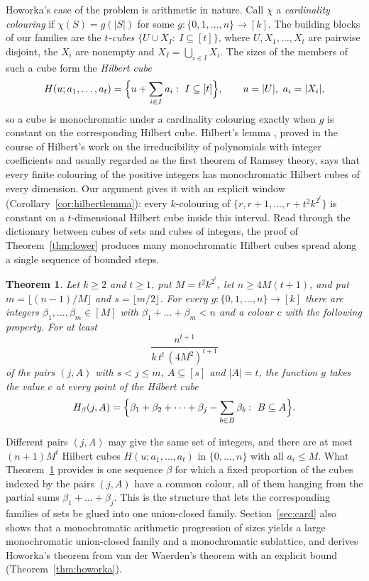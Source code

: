 \documentclass[11pt,reqno]{amsart}
\numberwithin{equation}{section}
\theoremstyle{plain}
\newtheorem{theorem}{Theorem}[section]
\theoremstyle{definition}
\theoremstyle{remark}
\begin{document}
Howorka's case of the problem is arithmetic in nature. Call $\chi$ a
\emph{cardinality colouring} if $\chi(S)=g(|S|)$ for some
$g:\{0,1,\dots,n\}\to[k]$. The building blocks of our families are the
\emph{$t$-cubes} $\{U\cup X_I:\ I\subseteq[t]\}$, where $U,X_1,\dots,X_t$
are pairwise disjoint, the $X_i$ are nonempty and
$X_I=\bigcup_{i\in I}X_i$. The sizes of the members of such a cube form
the \emph{Hilbert cube}
\[
H(u;a_1,\dots,a_t)=\Bigl\{u+\sum_{i\in I}a_i:\ I\subseteq[t]\Bigr\},
\qquad u=|U|,\ a_i=|X_i|,
\]
so a cube is monochromatic under a cardinality colouring exactly when $g$
is constant on the corresponding Hilbert cube. Hilbert's lemma
\cite{Hi1892}, proved in the course of Hilbert's work on the
irreducibility of polynomials with integer coefficients and usually
regarded as the first theorem of Ramsey theory, says that every finite
colouring of the positive integers has monochromatic Hilbert cubes of
every dimension. Our argument gives it with an explicit window
(Corollary~\ref{cor:hilbertlemma}): every $k$-colouring of
$\{r,r+1,\dots,r+t^{2}k^{2^{t}}\}$ is constant on a $t$-dimensional
Hilbert cube inside this interval. Read through the dictionary between
cubes of sets and cubes of integers, the proof of Theorem~\ref{thm:lower}
produces many monochromatic Hilbert cubes spread along a single sequence
of bounded steps.

\begin{theorem}
\label{thm:hilbert}
Let $k\ge2$ and $t\ge1$, put $M=t^{2}k^{2^{t}}$, let $n\ge4M(t+1)$, and
put $m=\lfloor(n-1)/M\rfloor$ and $s=\lfloor m/2\rfloor$. For every
$g:\{0,1,\dots,n\}\to[k]$ there are integers
$\beta_1,\dots,\beta_m\in[M]$ with $\beta_1+\dots+\beta_m<n$ and a colour
$c$ with the following property. For at least
\[
\frac{n^{t+1}}{k\,t^{t}\,(4M^{2})^{t+1}}
\]
of the pairs $(j,A)$ with $s<j\le m$, $A\subseteq[s]$ and $|A|=t$, the
function $g$ takes the value $c$ at every point of the Hilbert cube
\[
H_\beta(j,A)=\Bigl\{\beta_1+\beta_2+\dots+\beta_j-\sum_{b\in B}\beta_b:\
B\subseteq A\Bigr\}.
\]
\end{theorem}

Different pairs $(j,A)$ may give the same set of integers, and there are
at most $(n+1)M^{t}$ Hilbert cubes $H(u;a_1,\dots,a_t)$ in
$\{0,\dots,n\}$ with all $a_i\le M$. What Theorem~\ref{thm:hilbert}
provides is one sequence $\beta$ for which a fixed proportion of the cubes
indexed by the pairs $(j,A)$ have a common colour, all of them hanging
from the partial sums $\beta_1+\dots+\beta_j$. This is the structure that
lets the corresponding families of sets be glued into one union-closed
family. Section~\ref{sec:card} also shows that a monochromatic arithmetic
progression of sizes yields a large monochromatic union-closed family and
a monochromatic sublattice, and derives Howorka's theorem from van der
Waerden's theorem with an explicit bound (Theorem~\ref{thm:howorka}).
\end{document}
